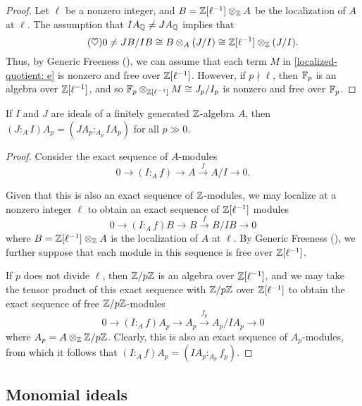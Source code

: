 \documentclass[11pt]{amsart}
\begin{document}
\begin{proof}
Let $\ell$ be a nonzero integer, and $B = \mathbb{Z}[\ell^{-1}] \otimes_{\mathbb{Z}} A$ be the localization of $A$ at $\ell$.  The assumption that $IA_{\mathbb{Q}} \neq JA_{\mathbb{Q}}$ implies that
%
\begin{equation}
\label{localized-quotient: e}
\tag{$\heartsuit$}
0 \neq JB/IB \cong B \otimes_A (J/I) \cong \mathbb{Z}[\ell^{-1}] \otimes_{\mathbb{Z}} (J/I) .
\end{equation}
Thus, by Generic Freeness (), we can assume that each term $M$ in \eqref{localized-quotient: e} is nonzero and free over $\mathbb{Z}[\ell^{-1}]$.  However,  if $p \nmid \ell$, then $\mathbb{F}_p$ is an algebra over $\mathbb{Z}[\ell^{-1}]$, and so $\mathbb{F}_p \otimes_{\mathbb{Z}[\ell^{-1}]} M \cong J_p / I_p$ is nonzero and free over $\mathbb{F}_p$.
\end{proof}

\begin{lemma}
\label{colon mod p: L}
 If $I$ and $J$ are ideals of a finitely generated $\mathbb{Z}$-algebra $A$, then $(J:_A I)A _p = (JA_p :_{A_p} IA_p)$ for all $p \gg 0$.
\end{lemma}

\begin{proof}
Consider the exact sequence of $A$-modules
\[ 0  \longrightarrow (I:_A f) \longrightarrow A \stackrel{f}{\longrightarrow} A/I \longrightarrow 0.  \]

Given that this is also an exact sequence of $\mathbb{Z}$-modules,  we may localize at a nonzero integer $\ell$ to obtain an exact sequence of $\mathbb{Z}[\ell^{-1}]$ modules
\[ 0  \longrightarrow (I:_A f)B \longrightarrow B \stackrel{f}{\longrightarrow} B/IB \longrightarrow 0  \] where $B = \mathbb{Z}[\ell^{-1}] \otimes_{\mathbb{Z}} A$ is the localization of $A$ at $\ell$.  By Generic Freeness (), we further suppose that each module in this sequence is free over  $\mathbb{Z}[\ell^{-1}]$.

If $p$ does not divide $\ell$, then $\mathbb{Z}/p\mathbb{Z}$ is an algebra over $\mathbb{Z}[\ell^{-1}]$, and we may take the tensor product of this exact sequence with $\mathbb{Z}/p\mathbb{Z}$ over $\mathbb{Z}[\ell^{-1}]$ to obtain the exact sequence of free $\mathbb{Z}/p\mathbb{Z}$-modules
\[ 0  \longrightarrow (I:_A f)A_p \longrightarrow A_p \stackrel{f_p}{\longrightarrow} A_p/IA_p \longrightarrow 0  \] where $A_p = A \otimes_{\mathbb{Z}} \mathbb{Z}/p\mathbb{Z}$.  Clearly, this is also an exact sequence of $A_p$-modules, from which it follows that $ (I:_A f) A_p = (IA_p :_{A_p} f_p)$.
\end{proof}

\subsection{Monomial ideals}
\end{document}
